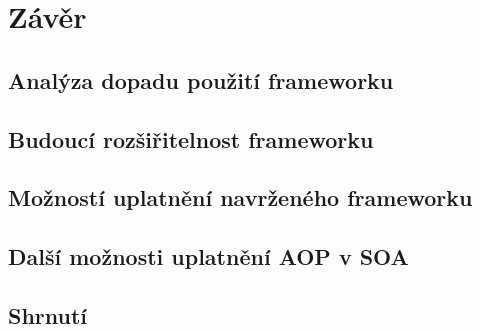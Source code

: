 \usepackage[T1]{fontenc}
\usepackage[utf8]{inputenc}


\chapter{Závěr}\label{ch:zaver}

\section{Analýza dopadu použití frameworku}

\section{Budoucí rozšiřitelnost frameworku}

\section{Možností uplatnění navrženého frameworku}

\section{Další možnosti uplatnění AOP v SOA}


\section{Shrnutí}

